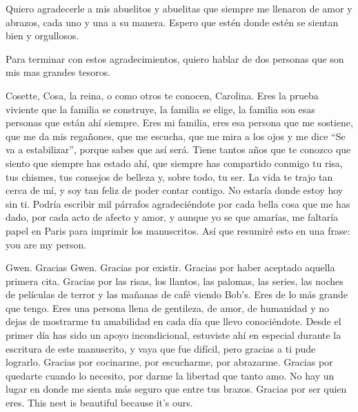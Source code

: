 Quiero agradecerle a mis abuelitos y abuelitas que siempre me llenaron de amor y abrazos, cada uno y una a su manera. Espero que estén donde estén se sientan bien y orgullosos.


\vspace{5mm}
Para terminar con estos agradecimientos, quiero hablar de dos personas que son mis mas grandes tesoros.

Cosette, Cosa, la reina, o como otros te conocen, Carolina. Eres la prueba viviente que la familia se construye, la familia se elige, la familia son esas personas que están ahí siempre. Eres mi familia, eres esa persona que me sostiene, que me da mis regañones, que me escucha, que me mira a los ojos y me dice “Se va a estabilizar”, porque sabes que así será. Tiene tantos años que te conozco que siento que siempre has estado ahí, que siempre has compartido conmigo tu risa, tus chismes, tus consejos de belleza y, sobre todo, tu ser. La vida te trajo tan cerca de mí, y soy tan feliz de poder contar contigo. No estaría donde estoy hoy sin ti. Podría escribir mil párrafos agradeciéndote por cada bella cosa que me has dado, por cada acto de afecto y amor, y aunque yo se que amarías, me faltaría papel en Paris para imprimir los manuscritos. Así que resumiré esto en una frase: you are my person.

Gwen. Gracias Gwen. Gracias por existir. Gracias por haber aceptado aquella primera cita. Gracias por las risas, los llantos, las palomas, las series, las noches de películas de terror y las mañanas de café viendo Bob’s. Eres de lo más grande que tengo. Eres una persona llena de gentileza, de amor, de humanidad y no dejas de mostrarme tu amabilidad en cada día que llevo conociéndote. Desde el primer día has sido un apoyo incondicional, estuviste ahí en especial durante la escritura de este manuscrito, y vaya que fue difícil, pero gracias a ti pude lograrlo. Gracias por cocinarme, por escucharme, por abrazarme. Gracias por quedarte cuando lo necesito, por darme la libertad que tanto amo. No hay un lugar en donde me sienta más seguro que entre tus brazos. Gracias por ser quien eres. This nest is beautiful because it’s ours.
